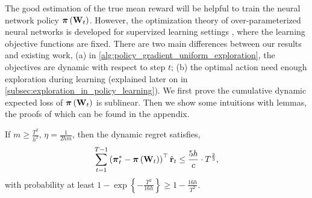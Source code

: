 The good estimation of the true mean reward will be helpful to train the neural network policy ${\boldsymbol{\pi}}\left( {\mathbf{W}}_t \right)$. However, the optimization theory of over-parameterized neural networks is developed for supervized learning settings \citep{li2018learning,allen2018convergenceB}, where the learning objective functions are fixed. There are two main differences between our results and existing work, (a) in \cref{alg:policy_gradient_uniform_exploration}, the objectives are dynamic with respect to step $t$; (b) the optimal action need enough exploration during learning (explained later on in \cref{subsec:exploration_in_policy_learning}). We first prove the cumulative dynamic expected loss of ${\boldsymbol{\pi}}\left( {\mathbf{W}}_t \right)$ is sublinear. Then we show some intuitions with lemmas, the proofs of which can be found in the appendix.
\begin{thm}
\label{thm:dynamic_regret_sublinear}
    If $m \ge \frac{T^2}{h^2}$, $\eta = \frac{1}{2 h m}$, then the dynamic regret satisfies,
\begin{equation*}
\begin{split}
    \sum\limits_{t=1}^{T-1}{ \left(  {{\boldsymbol{\pi}}_t^*} - {\boldsymbol{\pi}}\left( {\mathbf{W}}_t \right) \right)^\top \hat{{\mathbf{r}}}_t } \le \frac{5 h}{c} \cdot  T^{\frac{2}{3}},
\end{split}
\end{equation*}
with probability at least $1 - \exp\left\{ - \frac{T^2}{16 h} \right\} \ge 1 - \frac{16 h}{T^2}$.
\end{thm}
